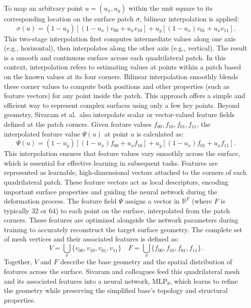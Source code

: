 To map an arbitrary point $u = (u_x, u_y)$ within the unit square to its corresponding location on the surface patch $\sigma$, bilinear interpolation is applied:
\[\sigma(u) = (1 - u_y)\left[(1 - u_x)v_{00} + u_x v_{10}\right] + u_y\left[(1 - u_x)v_{01} + u_x v_{11}\right]. \tag{1}\]
This two-stage interpolation first computes intermediate values along one axis (e.g., horizontal), then interpolates along the other axis (e.g., vertical).
The result is a smooth and continuous surface across each quadrilateral patch.
In this context, interpolation refers to estimating values at points within a patch based on the known values at its four corners.
Bilinear interpolation smoothly blends these corner values to compute both positions and other properties (such as feature vectors) for any point inside the patch.
This approach offers a simple and efficient way to represent complex surfaces using only a few key points.
Beyond geometry, Sivaram et al.\ also interpolate scalar or vector-valued feature fields defined at the patch corners.
Given feature values $f_{00}, f_{10}, f_{01}, f_{11}$, the interpolated feature value $\Psi(u)$ at point $u$ is calculated as:
\[\Psi(u) = (1 - u_y)\left[(1 - u_x)f_{00} + u_x f_{10}\right] + u_y\left[(1 - u_x)f_{01} + u_x f_{11}\right]. \tag{2}\]
This interpolation ensures that feature values vary smoothly across the surface, which is essential for effective learning in subsequent tasks.
Features are represented as learnable, high-dimensional vectors attached to the corners of each quadrilateral patch.
These feature vectors act as local descriptors, encoding important surface properties and guiding the neural network during the deformation process.
The feature field $\Psi$ assigns a vector in $\mathbb{R}^F$ (where $F$ is typically 32 or 64) to each point on the surface, interpolated from the patch corners.
These features are optimized alongside the network parameters during training to accurately reconstruct the target surface geometry.
The complete set of mesh vertices and their associated features is defined as:
\[V = \bigcup_{\sigma} \{v_{00}, v_{10}, v_{01}, v_{11}\}
\quad
F = \bigcup_{\sigma} \{f_{00}, f_{10}, f_{01}, f_{11}\}.\]
Together, $V$ and $F$ describe the base geometry and the spatial distribution of features across the surface.
Sivaram and colleagues feed this quadrilateral mesh and its associated features into a neural network, $\text{MLP}_\theta$, which learns to refine the geometry while preserving the simplified base’s topology and structural properties.





